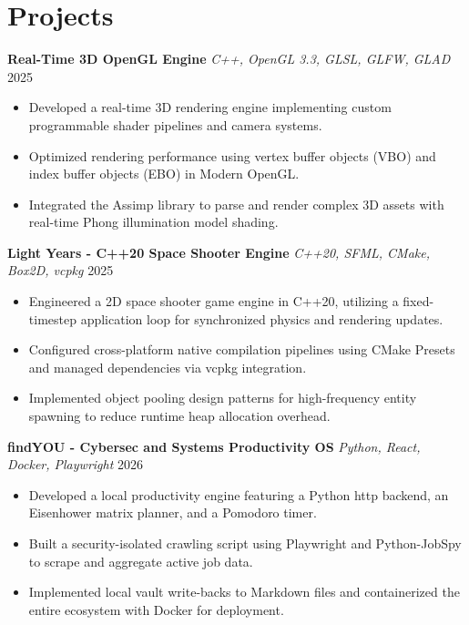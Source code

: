 \documentclass[a4paper,10pt]{article}
\begin{document}
\section*{Projects}
\textbf{Real-Time 3D OpenGL Engine} \enspace\textbar\enspace \textit{C++, OpenGL 3.3, GLSL, GLFW, GLAD} \hfill 2025 \\
\begin{itemize}
    \item Developed a real-time 3D rendering engine implementing custom programmable shader pipelines and camera systems.
    \item Optimized rendering performance using vertex buffer objects (VBO) and index buffer objects (EBO) in Modern OpenGL.
    \item Integrated the Assimp library to parse and render complex 3D assets with real-time Phong illumination model shading.
\end{itemize}

\vspace{3pt}
\textbf{Light Years - C++20 Space Shooter Engine} \enspace\textbar\enspace \textit{C++20, SFML, CMake, Box2D, vcpkg} \hfill 2025 \\
\begin{itemize}
    \item Engineered a 2D space shooter game engine in C++20, utilizing a fixed-timestep application loop for synchronized physics and rendering updates.
    \item Configured cross-platform native compilation pipelines using CMake Presets and managed dependencies via vcpkg integration.
    \item Implemented object pooling design patterns for high-frequency entity spawning to reduce runtime heap allocation overhead.
\end{itemize}


\vspace{3pt}
\textbf{findYOU - Cybersec and Systems Productivity OS} \enspace\textbar\enspace \textit{Python, React, Docker, Playwright} \hfill 2026 \\
\begin{itemize}
    \item Developed a local productivity engine featuring a Python http backend, an Eisenhower matrix planner, and a Pomodoro timer.
    \item Built a security-isolated crawling script using Playwright and Python-JobSpy to scrape and aggregate active job data.
    \item Implemented local vault write-backs to Markdown files and containerized the entire ecosystem with Docker for deployment.
\end{itemize}
\end{document}
